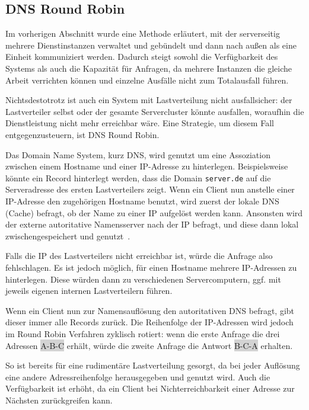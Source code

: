\subsection{DNS Round Robin}
Im vorherigen Abschnitt wurde eine Methode erläutert, mit der serverseitig mehrere Dienstinstanzen verwaltet und gebündelt und dann nach außen als eine Einheit kommuniziert werden. Dadurch steigt sowohl die Verfügbarkeit des Systems als auch die Kapazität für Anfragen, da mehrere Instanzen die gleiche Arbeit verrichten können und einzelne Ausfälle nicht zum Totalausfall führen.

Nichtsdestotrotz ist auch ein System mit Lastverteilung nicht ausfallsicher: der Lastverteiler selbst oder der gesamte Servercluster könnte ausfallen, woraufhin die Dienstleistung nicht mehr erreichbar wäre. Eine Strategie, um diesem Fall entgegenzusteuern, ist DNS Round Robin.

Das Domain Name System, kurz DNS, wird genutzt um eine Assoziation zwischen einem Hostname und einer IP-Adresse zu hinterlegen. Beispielsweise könnte ein Record hinterlegt werden, dass die Domain \verb|server.de| auf die Serveradresse des ersten Lastverteilers zeigt. Wenn ein Client nun anstelle einer IP-Adresse den zugehörigen Hostname benutzt, wird zuerst der lokale DNS (Cache) befragt, ob der Name zu einer IP aufgelöst werden kann. Ansonsten wird der externe autoritative Namensserver nach der IP befragt, und diese dann lokal zwischengespeichert und genutzt~\cite{Kopparapu.2002}.

Falls die IP des Lastverteilers nicht erreichbar ist, würde die Anfrage also fehlschlagen. Es ist jedoch möglich, für einen Hostname mehrere IP-Adressen zu hinterlegen. Diese würden dann zu verschiedenen Servercomputern, ggf. mit jeweils eigenen internen Lastverteilern führen.

Wenn ein Client nun zur Namensauflösung den autoritativen DNS befragt, gibt dieser immer alle Records zurück. Die Reihenfolge der IP-Adressen wird jedoch im Round Robin Verfahren zyklisch rotiert: wenn die erste Anfrage die drei Adressen \colorbox{lightgray}{A-B-C} erhält, würde die zweite Anfrage die Antwort \colorbox{lightgray}{B-C-A} erhalten.

So ist bereits für eine rudimentäre Lastverteilung gesorgt, da bei jeder Auflösung eine andere Adressreihenfolge herausgegeben und genutzt wird. Auch die Verfügbarkeit ist erhöht, da ein Client bei Nichterreichbarkeit einer Adresse zur Nächsten zurückgreifen kann.

